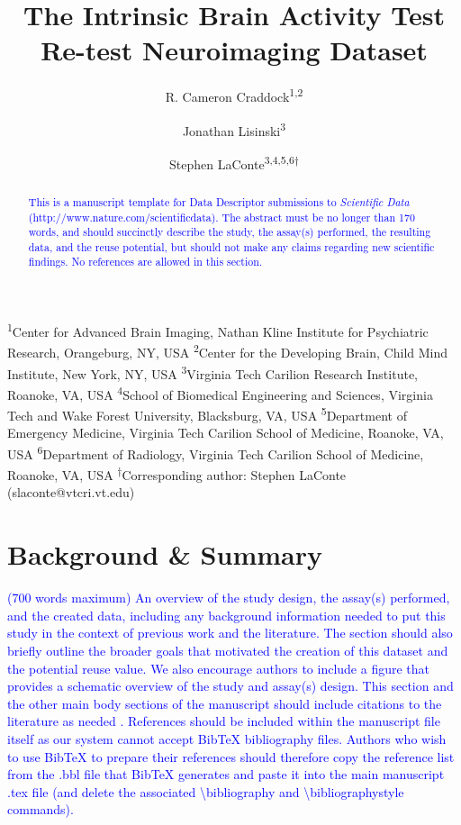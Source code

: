 \documentclass[english,11pt]{article}
\begin{document}
\title{The Intrinsic Brain Activity Test Re-test Neuroimaging Dataset}

\author{R. Cameron Craddock\textsuperscript{1,2} \and  
        Jonathan Lisinski\textsuperscript{3} \and 
        Stephen LaConte\textsuperscript{3,4,5,6$\dagger$}}


\maketitle

\textsuperscript{1}Center for Advanced Brain Imaging, Nathan Kline Institute for Psychiatric Research,      
    Orangeburg, NY, USA
\textsuperscript{2}Center for the Developing Brain, Child Mind Institute, New York, NY, USA
\textsuperscript{3}Virginia Tech Carilion Research Institute, Roanoke, VA, USA
\textsuperscript{4}School of Biomedical Engineering and Sciences, Virginia Tech and Wake Forest University,
    Blacksburg, VA, USA
\textsuperscript{5}Department of Emergency Medicine, Virginia Tech Carilion School of Medicine, Roanoke, VA, USA
\textsuperscript{6}Department of Radiology, Virginia Tech Carilion School of Medicine, Roanoke, VA, USA
\textsuperscript{$\dagger$}Corresponding author: Stephen LaConte (slaconte@vtcri.vt.edu)


\begin{abstract}
\textcolor{blue}{This is a manuscript template for Data Descriptor submissions to \emph{Scientific
Data} (http://www.nature.com/scientificdata). The abstract must be
no longer than 170 words, and should succinctly describe the study,
the assay(s) performed, the resulting data, and the reuse potential,
but should not make any claims regarding new scientific findings.
No references are allowed in this section.}
\end{abstract}

\section*{Background \& Summary}

\textcolor{blue}{(700 words maximum) An overview of the study design, the assay(s)
performed, and the created data, including any background information
needed to put this study in the context of previous work and the literature.
The section should also briefly outline the broader goals that motivated
the creation of this dataset and the potential reuse value. We also
encourage authors to include a figure that provides a schematic overview
of the study and assay(s) design. This section and the other main
body sections of the manuscript should include citations to the literature
as needed \cite{cite1, cite2}. References should be included within the 
manuscript file itself as our system cannot accept BibTeX bibliography files. 
Authors who wish to use BibTeX to prepare their references should therefore 
copy the reference list from the .bbl file that BibTeX generates and paste it 
into the main manuscript .tex file (and delete the associated 
\textbackslash{}bibliography and \textbackslash{}bibliographystyle commands).}
\end{document}
